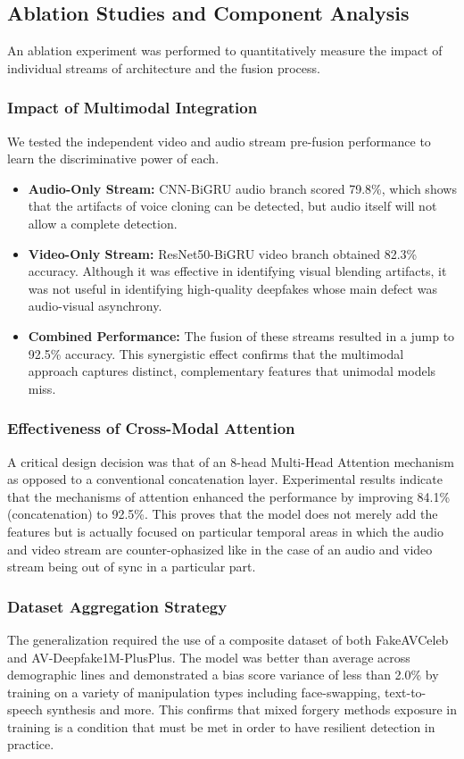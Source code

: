 \documentclass[conference]{IEEEtran}
\begin{document}
\subsection{Ablation Studies and Component Analysis}
An ablation experiment was performed to quantitatively measure the impact of individual streams of architecture and the fusion process.

\subsubsection{Impact of Multimodal Integration}
We tested the independent video and audio stream pre-fusion performance to learn the discriminative power of each.
\begin{itemize}
     \item \textbf{Audio-Only Stream:} CNN-BiGRU audio branch scored 79.8\%, which shows that the artifacts of voice cloning can be detected, but audio itself will not allow a complete detection.
    \item \textbf{Video-Only Stream:} ResNet50-BiGRU video branch obtained 82.3\% accuracy. Although it was effective in identifying visual blending artifacts, it was not useful in identifying high-quality deepfakes whose main defect was audio-visual asynchrony.
  \item \textbf{Combined Performance:} The fusion of these streams resulted in a jump to 92.5\% accuracy. This synergistic effect confirms that the multimodal approach captures distinct, complementary features that unimodal models miss.
\end{itemize}

\subsubsection{Effectiveness of Cross-Modal Attention}
A critical design decision was that of an 8-head Multi-Head Attention mechanism as opposed to a conventional concatenation layer. Experimental results indicate that the mechanisms of attention enhanced the performance by improving 84.1\%(concatenation) to 92.5\%. This proves that the model does not merely add the features but is actually focused on particular temporal areas in which the audio and video stream are counter-ophasized like in the case of an audio and video stream being out of sync in a particular part.

\subsubsection{Dataset Aggregation Strategy}
The generalization required the use of a composite dataset of both FakeAVCeleb and AV-Deepfake1M-PlusPlus. The model was better than average across demographic lines and demonstrated a bias score variance of less than 2.0\% by training on a variety of manipulation types including face-swapping, text-to-speech synthesis and more. This confirms that mixed forgery methods exposure in training is a condition that must be met in order to have resilient detection in practice.
\end{document}

